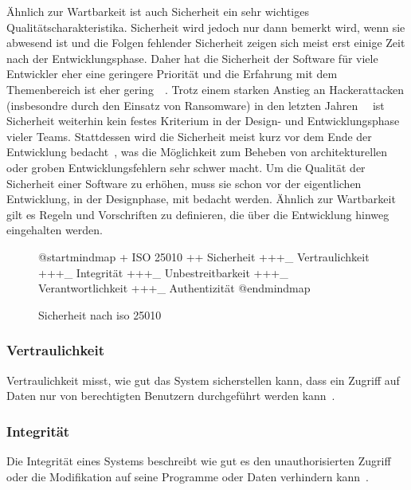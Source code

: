 \documentclass[12pt, a4paper, ngerman]{article}
\begin{document}
Ähnlich zur Wartbarkeit ist auch Sicherheit ein sehr wichtiges Qualitätscharakteristika.
Sicherheit wird jedoch nur dann bemerkt wird, wenn sie abwesend ist und 
die Folgen fehlender Sicherheit zeigen sich meist erst einige Zeit nach der Entwicklungsphase.
Daher hat die Sicherheit der Software für viele Entwickler eher eine geringere Priorität 
und die Erfahrung mit dem Themenbereich ist eher gering~\cite{Roshaidie_Liang_Jun_Yew_Fatima-Tuz-Zahra_2020}~\cite{Tahaei_Jenkins_Vaniea_Wolters_2021}.
Trotz einem starken Anstieg an Hackerattacken (insbesondre durch den Einsatz von Ransomware) 
in den letzten Jahren~\cite{BSI_2022}~\cite{Statistik_Cybersecurity_2022} ist Sicherheit weiterhin kein festes Kriterium 
in der Design- und Entwicklungsphase vieler Teams.
Stattdessen wird die Sicherheit meist kurz vor dem Ende der Entwicklung bedacht~\cite{Roshaidie_Liang_Jun_Yew_Fatima-Tuz-Zahra_2020}, 
was die Möglichkeit zum Beheben von architekturellen oder groben Entwicklungsfehlern sehr schwer macht.
Um die Qualität der Sicherheit einer Software zu erhöhen, muss sie schon vor der eigentlichen Entwicklung, 
in der Designphase, mit bedacht werden. Ähnlich zur Wartbarkeit gilt es Regeln und Vorschriften zu definieren, 
die über die Entwicklung hinweg eingehalten werden.

\begin{figure}
  \centering
  \begin{plantuml}
    @startmindmap
    + ISO 25010
    ++ Sicherheit
    +++_ Vertraulichkeit
    +++_ Integrität
    +++_ Unbestreitbarkeit
    +++_ Verantwortlichkeit
    +++_ Authentizität
    @endmindmap
  \end{plantuml}
  \caption{Sicherheit nach \ac{iso} 25010~\cite{ISO25010}}
  \label{fig:uml:security}
\end{figure}

\subsubsection{Vertraulichkeit}

Vertraulichkeit misst, wie gut das System sicherstellen kann, 
dass ein Zugriff auf Daten nur von berechtigten Benutzern durchgeführt werden kann~\cite{ISO25010}.

\subsubsection{Integrität}

Die Integrität eines Systems beschreibt wie gut es den unauthorisierten Zugriff 
oder die Modifikation auf seine Programme oder Daten verhindern kann~\cite{ISO25010}.
\end{document}
